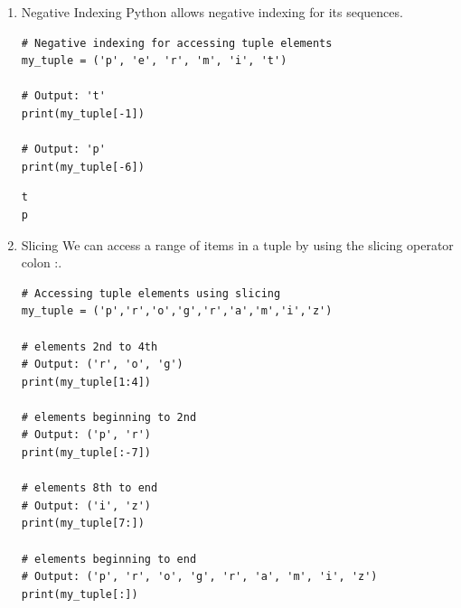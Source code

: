 \documentclass[a4paper,12pt]{article}
\begin{document}
\begin{enumerate}
\begin{enumerate}
\begin{lstlisting}
print(my_tuple[0])   # 'p'
print(my_tuple[5])   # 't'

# IndexError: list index out of range
# print(my_tuple[6])

# Index must be an integer
# TypeError: list indices must be integers, not float
# my_tuple[2.0]

# nested tuple
n_tuple = ("mouse", [8, 4, 6], (1, 2, 3))

# nested index
print(n_tuple[0][3])       # 's'
print(n_tuple[1][1])       # 4
\end{lstlisting}

\begin{verbatim}
p
t
s
4
\end{verbatim}

\item Negative Indexing
\label{sec:org72e8ff3}
Python allows negative indexing for its sequences.\\
\lstset{breaklines=true,language=Python,label= ,caption= ,captionpos=b,firstnumber=1,numbers=left}
\begin{lstlisting}
# Negative indexing for accessing tuple elements
my_tuple = ('p', 'e', 'r', 'm', 'i', 't')

# Output: 't'
print(my_tuple[-1])

# Output: 'p'
print(my_tuple[-6])
\end{lstlisting}

\begin{verbatim}
t
p
\end{verbatim}

\item Slicing
\label{sec:org7ec7450}
We can access a range of items in a tuple by using the slicing operator colon :.\\
\lstset{breaklines=true,language=Python,label= ,caption= ,captionpos=b,firstnumber=1,numbers=left}
\begin{lstlisting}
# Accessing tuple elements using slicing
my_tuple = ('p','r','o','g','r','a','m','i','z')

# elements 2nd to 4th
# Output: ('r', 'o', 'g')
print(my_tuple[1:4])

# elements beginning to 2nd
# Output: ('p', 'r')
print(my_tuple[:-7])

# elements 8th to end
# Output: ('i', 'z')
print(my_tuple[7:])

# elements beginning to end
# Output: ('p', 'r', 'o', 'g', 'r', 'a', 'm', 'i', 'z')
print(my_tuple[:])
\end{lstlisting}


\end{enumerate}
\end{enumerate}
\end{document}
